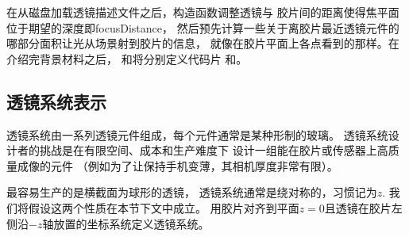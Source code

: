 在从磁盘加载透镜描述文件之后，构造函数调整透镜与
胶片间的距离使得焦平面位于期望的深度即{\ttfamily focusDistance}，
然后预先计算一些关于离胶片最近透镜元件的哪部分面积让光从场景射到胶片的信息，
就像在胶片平面上各点看到的那样。在介绍完背景材料之后，
和将分别定义代码片
和。

\subsection{透镜系统表示}\label{sub:透镜系统表示}
透镜系统由一系列透镜元件组成，每个元件通常是某种形制的玻璃。
透镜系统设计者的挑战是在有限空间、成本和生产难度下
设计一组能在胶片或传感器上高质量成像的元件
（例如为了让保持手机变薄，其相机厚度非常有限）。

最容易生产的是横截面为球形的透镜，
透镜系统通常是绕对称的，习惯记为$z$.
我们将假设这两个性质在本节下文中成立。
用胶片对齐到平面$z=0$且透镜在胶片左侧沿$-z$轴放置的坐标系统定义透镜系统。

